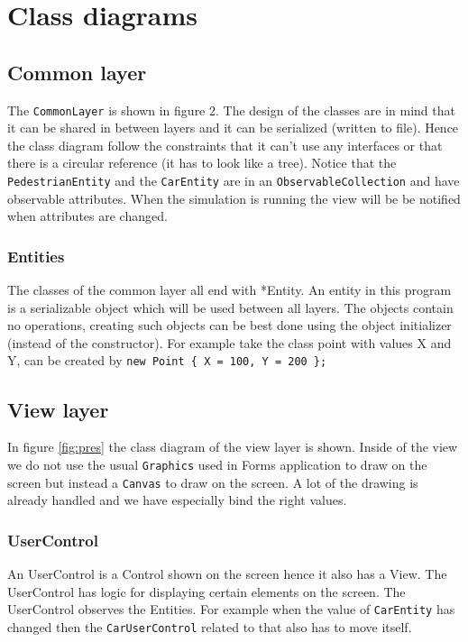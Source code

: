 \section{Class diagrams}
\subsection{Common layer}
The \texttt{CommonLayer} is shown in figure 2. The design of the classes are in mind that it can be shared in between layers and it can be serialized (written to file). Hence the class diagram follow the constraints that it can't use any interfaces or that there is a circular reference (it has to look like a tree). Notice that the 
\texttt{PedestrianEntity} and the \texttt{CarEntity} are in an \texttt{ObservableCollection} and have observable attributes. When the simulation is running the view will be be notified when attributes are changed.

\subsubsection{Entities}
The classes of the common layer all end with *Entity. An entity in this program is a serializable object which will be used between all layers. The objects contain no operations, creating such objects can be best done using the object initializer (instead of the constructor). For example take the class point with values X and Y, can be created by \texttt{new Point \{ X = 100, Y = 200 \};}  

\subsection{View layer}
In figure \ref{fig:pres} the class diagram of the view layer is shown. Inside of the view we do not use the usual \texttt{Graphics} used in Forms application to draw on the screen but instead a \texttt{Canvas} to draw on the screen. A lot of the drawing is already handled and we have especially bind the right values.

\subsubsection{UserControl}
An UserControl is a Control shown on the screen hence it also has a View. The UserControl has logic for displaying certain elements on the screen. The UserControl observes the Entities. For example when the value of \texttt{CarEntity} has changed then the \texttt{CarUserControl} related to that also has to move itself.

